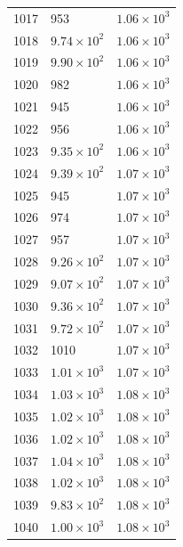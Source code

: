 \begin{table}[H]
\begin{tabular}{lll}
1017 & 953 & $\displaystyle 1.06 \times 10^{3}$ \\
1018 & $\displaystyle 9.74 \times 10^{2}$ & $\displaystyle 1.06 \times 10^{3}$ \\
1019 & $\displaystyle 9.90 \times 10^{2}$ & $\displaystyle 1.06 \times 10^{3}$ \\
1020 & 982 & $\displaystyle 1.06 \times 10^{3}$ \\
1021 & 945 & $\displaystyle 1.06 \times 10^{3}$ \\
1022 & 956 & $\displaystyle 1.06 \times 10^{3}$ \\
1023 & $\displaystyle 9.35 \times 10^{2}$ & $\displaystyle 1.06 \times 10^{3}$ \\
1024 & $\displaystyle 9.39 \times 10^{2}$ & $\displaystyle 1.07 \times 10^{3}$ \\
1025 & 945 & $\displaystyle 1.07 \times 10^{3}$ \\
1026 & 974 & $\displaystyle 1.07 \times 10^{3}$ \\
1027 & 957 & $\displaystyle 1.07 \times 10^{3}$ \\
1028 & $\displaystyle 9.26 \times 10^{2}$ & $\displaystyle 1.07 \times 10^{3}$ \\
1029 & $\displaystyle 9.07 \times 10^{2}$ & $\displaystyle 1.07 \times 10^{3}$ \\
1030 & $\displaystyle 9.36 \times 10^{2}$ & $\displaystyle 1.07 \times 10^{3}$ \\
1031 & $\displaystyle 9.72 \times 10^{2}$ & $\displaystyle 1.07 \times 10^{3}$ \\
1032 & 1010 & $\displaystyle 1.07 \times 10^{3}$ \\
1033 & $\displaystyle 1.01 \times 10^{3}$ & $\displaystyle 1.07 \times 10^{3}$ \\
1034 & $\displaystyle 1.03 \times 10^{3}$ & $\displaystyle 1.08 \times 10^{3}$ \\
1035 & $\displaystyle 1.02 \times 10^{3}$ & $\displaystyle 1.08 \times 10^{3}$ \\
1036 & $\displaystyle 1.02 \times 10^{3}$ & $\displaystyle 1.08 \times 10^{3}$ \\
1037 & $\displaystyle 1.04 \times 10^{3}$ & $\displaystyle 1.08 \times 10^{3}$ \\
1038 & $\displaystyle 1.02 \times 10^{3}$ & $\displaystyle 1.08 \times 10^{3}$ \\
1039 & $\displaystyle 9.83 \times 10^{2}$ & $\displaystyle 1.08 \times 10^{3}$ \\
1040 & $\displaystyle 1.00 \times 10^{3}$ & $\displaystyle 1.08 \times 10^{3}$ \\

\end{tabular}
\end{table}
